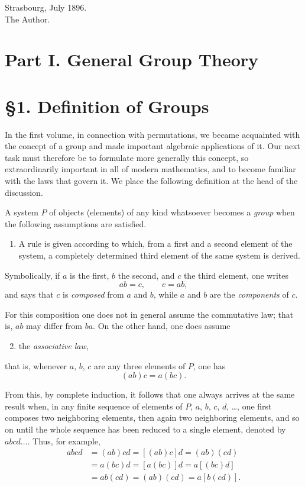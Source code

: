 \documentclass[11pt]{article}
\begin{document}
\begin{flushright}
Strasbourg, July 1896.\\
The Author.
\end{flushright}

\section*{Part I. General Group Theory}
\section*{\S 1. Definition of Groups}
In the first volume, in connection with permutations, we became acquainted with the concept of a group and made important algebraic applications of it. Our next task must therefore be to formulate more generally this concept, so extraordinarily important in all of modern mathematics, and to become familiar with the laws that govern it. We place the following definition at the head of the discussion.

A system $P$ of objects (elements) of any kind whatsoever becomes a \emph{group} when the following assumptions are satisfied.

\begin{enumerate}
\item A rule is given according to which, from a first and a second element of the system, a completely determined third element of the same system is derived.
\end{enumerate}

Symbolically, if $a$ is the first, $b$ the second, and $c$ the third element, one writes
\[
ab=c,\qquad c=ab,
\]
and says that $c$ is \emph{composed} from $a$ and $b$, while $a$ and $b$ are the \emph{components} of $c$.

For this composition one does not in general assume the commutative law; that is, $ab$ may differ from $ba$. On the other hand, one does assume

\begin{enumerate}
\setcounter{enumi}{1}
\item the \emph{associative law},
\end{enumerate}
that is, whenever $a$, $b$, $c$ are any three elements of $P$, one has
\[
(ab)c=a(bc).
\]

From this, by complete induction, it follows that one always arrives at the same result when, in any finite sequence of elements of $P$, $a$, $b$, $c$, $d$, \dots, one first composes two neighboring elements, then again two neighboring elements, and so on until the whole sequence has been reduced to a single element, denoted by $abcd\dots$. Thus, for example,
\begin{align*}
abcd &= (ab)cd = [(ab)c]d = (ab)(cd) \\
     &= a(bc)d = [a(bc)]d = a[(bc)d] \\
     &= ab(cd) = (ab)(cd) = a[b(cd)].
\end{align*}
\end{document}
